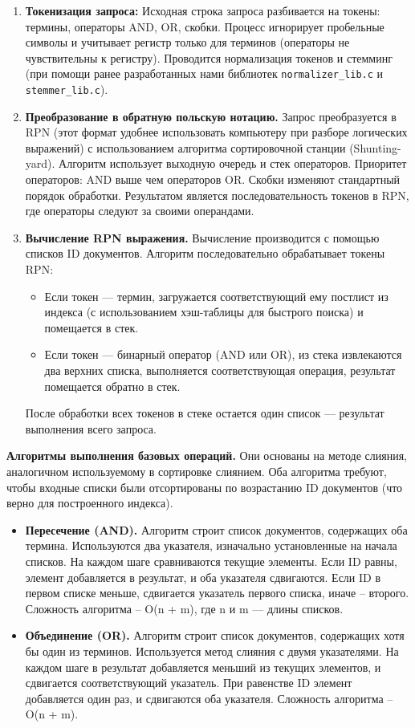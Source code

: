 \begin{enumerate}
    \item \textbf{Токенизация запроса:} Исходная строка запроса разбивается на токены: термины, операторы AND, OR, скобки. Процесс игнорирует пробельные символы и учитывает регистр только для терминов (операторы не чувствительны к регистру). Проводится нормализация токенов и стемминг (при помощи ранее разработанных нами библиотек \texttt{normalizer\_lib.c} и \texttt{stemmer\_lib.c}).
    \item \textbf{Преобразование в обратную польскую нотацию.} Запрос преобразуется в RPN (этот формат удобнее использовать компьютеру при разборе логических выражений) с использованием алгоритма сортировочной станции (Shunting-yard). Алгоритм использует выходную очередь и стек операторов. Приоритет операторов: AND выше чем операторов OR. Скобки изменяют стандартный порядок обработки. Результатом является последовательность токенов в RPN, где операторы следуют за своими операндами.
    \item \textbf{Вычисление RPN выражения.} Вычисление производится с помощью списков ID документов. Алгоритм последовательно обрабатывает токены RPN:
    \begin{itemize}
        \item Если токен — термин, загружается соответствующий ему постлист из индекса (с использованием хэш-таблицы для быстрого поиска) и помещается в стек.
        \item Если токен — бинарный оператор (AND или OR), из стека извлекаются два верхних списка, выполняется соответствующая операция, результат помещается обратно в стек.
    \end{itemize}
    После обработки всех токенов в стеке остается один список — результат выполнения всего запроса.
\end{enumerate}

\vspace{1 em}
\noindent\textbf{Алгоритмы выполнения базовых операций.} Они основаны на методе слияния, аналогичном используемому в сортировке слиянием. Оба алгоритма требуют, чтобы входные списки были отсортированы по возрастанию ID документов (что верно для построенного индекса).

\begin{itemize}
    \item \textbf{Пересечение (AND).} Алгоритм строит список документов, содержащих оба термина. Используются два указателя, изначально установленные на начала списков. На каждом шаге сравниваются текущие элементы. Если ID равны, элемент добавляется в результат, и оба указателя сдвигаются. Если ID в первом списке меньше, сдвигается указатель первого списка, иначе -- второго. Сложность алгоритма -- O(n + m), где n и m — длины списков.
    
    \item \textbf{Объединение (OR).} Алгоритм строит список документов, содержащих хотя бы один из терминов. Используется метод слияния с двумя указателями. На каждом шаге в результат добавляется меньший из текущих элементов, и сдвигается соответствующий указатель. При равенстве ID элемент добавляется один раз, и сдвигаются оба указателя. Сложность алгоритма -- O(n + m).
\end{itemize}

